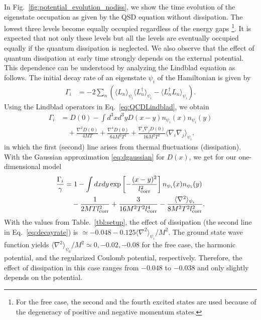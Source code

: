 \documentclass[prd,11pt, amsmath, amsymb, aps, reprint, tightenlines, nofootinbib, longbibliography, abbrv, preprintnumbers]{revtex4-1}
\begin{document}
In Fig.~\ref{fig:potential_evolution_nodiss}, we show the time evolution of the eigenstate occupation as given by the QSD equation without dissipation.
The lowest three levels become equally occupied regardless of the energy gaps
\footnote{
For the free case, the second and the fourth excited states are used because of the degeneracy of positive and negative momentum states.
}.
It is expected that not only these levels but all the levels are eventually occupied equally if the quantum dissipation is neglected.
We also observe that the effect of quantum dissipation at early time strongly depends on the external potential.
This dependence can be understood by analyzing the Lindblad equation as follows.
The initial decay rate of an eigenstate $\psi_i$ of the Hamiltonian is given by
\begin{align}
\Gamma_i &= -2\sum_{n}\left(
\langle L_n\rangle_{\psi_i}\langle L_n^{\dagger}\rangle_{\psi_i}
-\langle L_n^{\dagger}L_n\rangle_{\psi_i}
\right).
\end{align}
Using the Lindblad operators in Eq.~\eqref{eq:QCDLindblad}, we obtain
\begin{align}
\Gamma_i
&= D(0) - \int d^3xd^3y D(x-y)n_{\psi_i}(x) n_{\psi_i}(y) \\
& \quad +\frac{\nabla^2 D(0)}{4MT} + \frac{\nabla^4 D(0)}{64M^2T^2}
+\frac{\nabla_i\nabla_j D(0)}{16M^2T^2} \langle \nabla_i\nabla_j\rangle_{\psi_i}, \nonumber
\end{align}
in which the first (second) line arises from thermal fluctuations (dissipation).
With the Gaussian approximation \eqref{eq:dgaussian} for $D(x)$, we get for our one-dimensional model
\begin{align}
\label{eq:decayrate}
\frac{\Gamma_i}{\gamma} &= 1 - \int dxdy \exp\left[-\frac{(x-y)^2}{l_{\rm corr}^2}\right]n_{\psi_i}(x) n_{\psi_i}(y) \nonumber \\
& \quad -\frac{1}{2MTl_{\rm corr}^2} +\frac{3}{16M^2T^2l_{\rm corr}^4} 
- \frac{\langle\nabla^2\rangle_{\psi_i}}{8M^2T^2l_{\rm corr}^2}.
\end{align}
With the values from Table.~\ref{tbl:setup}, the effect of dissipation (the second line in Eq.~\eqref{eq:decayrate}) is $\simeq -0.048 - 0.125\langle\nabla^2\rangle_{\psi_i} /M^2$.
The ground state wave function yields
$\langle\nabla^2\rangle_{\psi_0}/M^2\simeq 0, -0.02, -0.08$ for the free
case, the harmonic potential, and the regularized Coulomb potential, respectively.
Therefore, the effect of dissipation in this case ranges from $-0.048$ to $-0.038$ and only slightly depends on the potential. 
\end{document}

